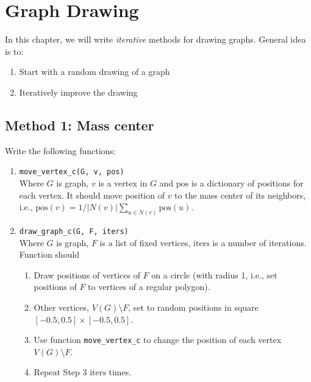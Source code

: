 \chapter{Graph Drawing}

In this chapter, we will write \emph{iterative} methods for drawing graphs. General idea is to:
\begin{enumerate}
\item Start with a random drawing of a graph
\item Iteratively improve the drawing
\end{enumerate}

\section{Method 1: Mass center}

Write the following functions:
\begin{enumerate}
\item \verb|move_vertex_c(G, v, pos)|\\
    Where $G$ is graph, $v$ is a vertex in $G$ and $\mathrm{pos}$ is a dictionary of positions for each vertex. It should move position of $v$ to the mass center of its neighbors, i.e., $\mathrm{pos}(v) = 1/|N(v)| \sum_{u \in N(v)} \mathrm{pos}(u)$.
\item \verb|draw_graph_c(G, F, iters)|\\
    Where $G$ is graph, $F$ is a list of fixed vertices, $\mathrm{iters}$ is a number of iterations. Function should
    \begin{enumerate}
        \item Draw positions of vertices of $F$ on a circle (with radius 1, i.e., set positions of $F$ to vertices of a regular polygon).
        \item Other vertices, $V(G)\setminus F$, set to random positions in square $[-0.5, 0.5] \times [-0.5, 0.5]$.
        \item Use function \verb|move_vertex_c| to change the position of each vertex $V(G)\setminus F$.
        \item Repeat Step 3 $\mathrm{iters}$ times.
    \end{enumerate}
\end{enumerate}

